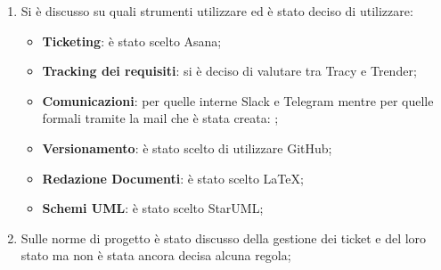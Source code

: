 \documentclass[a4paper,titlepage]{article}
\begin{document}
\begin{enumerate}
\begin{enumerate}
\begin{itemize}
    			\item accademiche.
    		\end{itemize}
    		\item \textbf{Viviana}:
    		\begin{itemize}
    			\item accademiche;
    			\item latex.
    		\end{itemize}
    		\item \textbf{Luca}: 
    		\begin{itemize}
    			\item accademiche;
    			\item analisi.
    		\end{itemize}
    		\item \textbf{Tommaso}: 
    		\begin{itemize}
    			\item accademiche;
    			\item matematica;
    			\item iOS;
    			\item C++;
    			\item Conoscenze sui beacon.
    		\end{itemize}
    		\item \textbf{Enrico}:
    		\begin{itemize}
    			\item Java
    			\item HTML;
    			\item JavaScript;
    			\item C++.
    		\end{itemize}
    		\item \textbf{Matteo}: 
    		\begin{itemize}
    			\item accademiche.
    		\end{itemize}
    	\end{enumerate}
    	
  
  \item Si è discusso su quali strumenti utilizzare ed è stato deciso di utilizzare:
  \begin{itemize}
  	\item \textbf{Ticketing}: è stato scelto Asana;
  	\item \textbf{Tracking dei requisiti}: si è deciso di valutare tra Tracy e Trender;
  	\item \textbf{Comunicazioni}: per quelle interne Slack e Telegram mentre per quelle formali tramite la mail che è stata creata: ;
  	\item \textbf{Versionamento}: è stato scelto di utilizzare GitHub;
  	\item \textbf{Redazione Documenti}: è stato scelto \LaTeX;
  	\item \textbf{Schemi UML}: è stato scelto StarUML;
  \end{itemize}
  \item Sulle norme di progetto è stato discusso della gestione dei ticket e del loro stato ma non è stata ancora decisa alcuna regola;
\end{enumerate}
\end{document}
